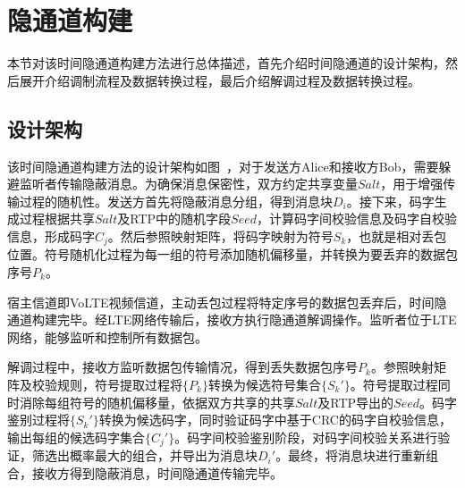 \section{隐通道构建}
\label{chap:hash:designation}

本节对该时间隐通道构建方法进行总体描述，首先介绍时间隐通道的设计架构，然后展开介绍调制流程及数据转换过程，最后介绍解调过程及数据转换过程。

\subsection{设计架构}
\label{chap:hash:designation:model}


该时间隐通道构建方法的设计架构如图\ ，对于发送方Alice和接收方Bob，需要躲避监听者传输隐蔽消息。为确保消息保密性，双方约定共享变量$Salt$，用于增强传输过程的随机性。发送方首先将隐蔽消息分组，得到消息块$D_{i}$。接下来，码字生成过程根据共享$Salt$及RTP中的随机字段$Seed$，计算码字间校验信息及码字自校验信息，形成码字$C_{j}$。然后参照映射矩阵，将码字映射为符号$S_{k}$，也就是相对丢包位置。符号随机化过程为每一组的符号添加随机偏移量，并转换为要丢弃的数据包序号$P_{k}$。

宿主信道即VoLTE视频信道，主动丢包过程将特定序号的数据包丢弃后，时间隐通道构建完毕。经LTE网络传输后，接收方执行隐通道解调操作。监听者位于LTE网络，能够监听和控制所有数据包。

解调过程中，接收方监听数据包传输情况，得到丢失数据包序号$P_{k}$。参照映射矩阵及校验规则，符号提取过程将$\{P_{k}\}$转换为候选符号集合$\{S_{k}'\}$。符号提取过程同时消除每组符号的随机偏移量，依据双方共享的共享$Salt$及RTP导出的$Seed$。码字鉴别过程将$\{S_{k}'\}$转换为候选码字，同时验证码字中基于CRC的码字自校验信息，输出每组的候选码字集合$\{C_{j}'\}$。码字间校验鉴别阶段，对码字间校验关系进行验证，筛选出概率最大的组合，并导出为消息块$D_{i}'$。最终，将消息块进行重新组合，接收方得到隐蔽消息，时间隐通道传输完毕。


